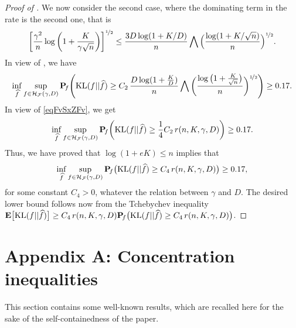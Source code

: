 \begin{proof}[Proof of ]
	We now consider the second case, where the dominating term in the rate is the 
	second one, that is
	\begin{equation}\label{eqFvSxZFv}
	\bigg[\frac{\gamma^2}{n} \log\bigg(1+\frac{K}{\gamma\sqrt{n}}\bigg)\bigg]^{\nicefrac12}
	\le \frac{ 3 D\log(1+K/D)}{n}\bigwedge 
	\Big(\frac{\log(1+K/\sqrt{n})}{n}\Big)^{\nicefrac12}.
	\end{equation}
	In view of , we have
	\begin{equation}
	\small
	\inf_{\widehat f}\sup_{f \in \mathcal H_\mathcal F(\gamma,D)}\mathbf P\!_{f}\Bigg({\rm KL}(f||\widehat f)\geq
	C_2\,\frac{D\log(1+\frac{K}{D})}{n}\bigwedge\bigg(\frac{\log\big(1+\frac{K}{\sqrt{n}}\big)}{n}\bigg)^{\nicefrac12}\Bigg)
	\geq 0.17.
	\end{equation}
	In view of \eqref{eqFvSxZFv}, we get
	\begin{equation}\label{eqFvSxZSx}
	\inf_{\widehat f}\sup_{f \in \mathcal H_\mathcal F(\gamma,D)}\mathbf P\!_{f}\bigg({\rm KL}(f||\widehat f)\geq
	\frac14 C_2\,r(n,K,\gamma,D)\bigg)\geq 0.17.
	\end{equation}
	Thus, we have proved that $\log(1+eK)\le n$ implies that
	\begin{equation}
		\inf_{\widehat f}\sup_{f \in \mathcal H_\mathcal F(\gamma,D)}\mathbf P\!_{f}\big({\rm KL}(f||\widehat f)\geq
	C_4\,r(n,K,\gamma,D)\big)\geq 0.17,
	\end{equation}
	for some constant $C_4>0$, whatever the relation
	between $\gamma$ and $D$. The desired lower bound follows now from the Tchebychev 
	inequality
	$\mathbf E\big[{\rm KL}(f||\widehat f)\big]\ge C_4\,r(n,K,\gamma,D)
	\mathbf P\!_{f}\big({\rm KL}(f||\widehat f)\geq C_4\,r(n,K,\gamma,D)\big)$.
\end{proof}


\section*{Appendix A: Concentration inequalities} %
\label{sec:appendix_a}

This section contains some well-known results, which are recalled here for the sake of the self-containedness
of the paper.

